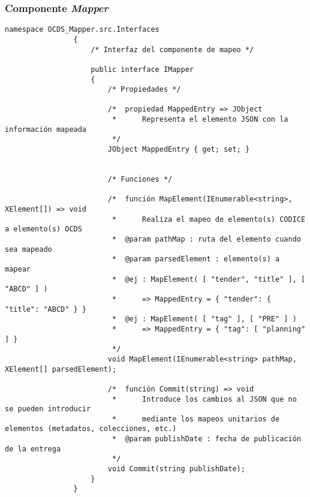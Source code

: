         \subsubsection{Componente \textit{Mapper}}
            \begin{lstlisting}[language=lCSharp]
                namespace OCDS_Mapper.src.Interfaces
                {
                    /* Interfaz del componente de mapeo */
                
                    public interface IMapper
                    {
                        /* Propiedades */
                
                        /*  propiedad MappedEntry => JObject
                         *      Representa el elemento JSON con la información mapeada
                         */
                        JObject MappedEntry { get; set; }
                
                
                        /* Funciones */
                
                        /*  función MapElement(IEnumerable<string>, XElement[]) => void
                         *      Realiza el mapeo de elemento(s) CODICE a elemento(s) OCDS
                         *  @param pathMap : ruta del elemento cuando sea mapeado
                         *  @param parsedElement : elemento(s) a mapear
                         *  @ej : MapElement( [ "tender", "title" ], [ "ABCD" ] )
                         *      => MappedEntry = { "tender": { "title": "ABCD" } }
                         *  @ej : MapElement( [ "tag" ], [ "PRE" ] )
                         *      => MappedEntry = { "tag": [ "planning" ] }
                         */
                        void MapElement(IEnumerable<string> pathMap, XElement[] parsedElement);
                
                        /*  función Commit(string) => void
                         *      Introduce los cambios al JSON que no se pueden introducir
                         *      mediante los mapeos unitarios de elementos (metadatos, colecciones, etc.)
                         *  @param publishDate : fecha de publicación de la entrega
                         */
                        void Commit(string publishDate);
                    }
                }
            \end{lstlisting}
\newpage
